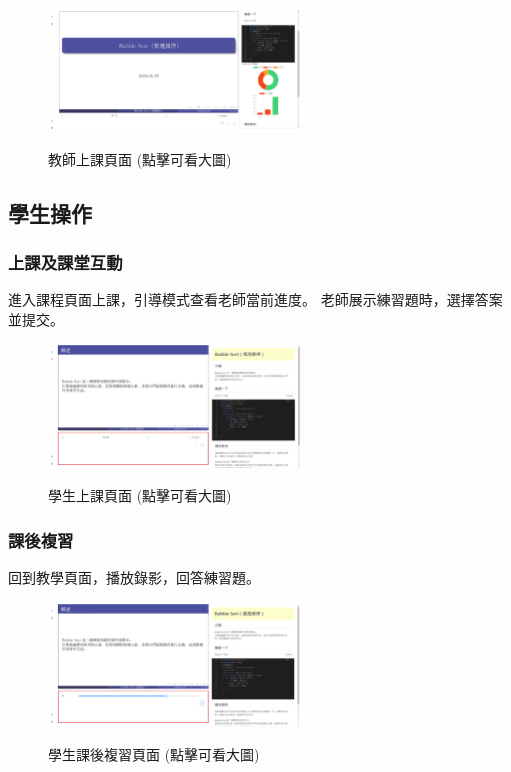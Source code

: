 \documentclass[12pt]{article}
\begin{document}
\begin{figure}[H]
  \centering
  \href{https://raw.githubusercontent.com/programingtw/proglearn-plan/main/2023全國大專校院智慧創新暨跨域整合創作競賽/img/teacher.png}{
    \includegraphics[width=0.60\textwidth]{./img/teacher.png}
  }
  \caption{教師上課頁面 (點擊可看大圖)}
\end{figure}

\subsection{學生操作}
\subsubsection{上課及課堂互動}
進入課程頁面上課，引導模式查看老師當前進度。
老師展示練習題時，選擇答案並提交。

\begin{figure}[H]
  \centering
  \href{https://raw.githubusercontent.com/programingtw/proglearn-plan/main/2023全國大專校院智慧創新暨跨域整合創作競賽/img/student2.png}{
    \includegraphics[width=0.60\textwidth]{./img/student2.png}
  }
  \caption{學生上課頁面 (點擊可看大圖)}
\end{figure}

\subsubsection{課後複習}
回到教學頁面，播放錄影，回答練習題。

\begin{figure}[H]
  \centering
  \href{https://raw.githubusercontent.com/programingtw/proglearn-plan/main/2023全國大專校院智慧創新暨跨域整合創作競賽/img/student3.png}{
    \includegraphics[width=0.60\textwidth]{./img/student3.png}
  }
  \caption{學生課後複習頁面 (點擊可看大圖)}
\end{figure}
\end{document}
